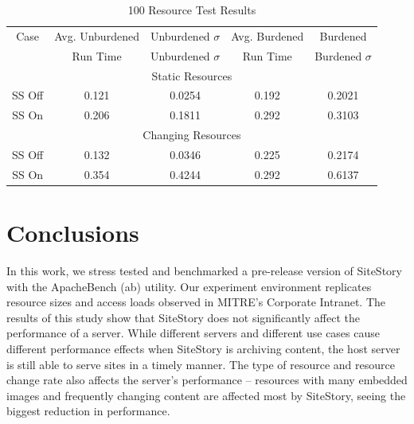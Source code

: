 \documentclass[runningheads,a4paper]{llncs}
\begin{document}
\begin{table}[t]
\caption{100 Resource Test Results} %
\centering %
\begin{tabular}{c c c c c} %
\hline\hline %
Case & Avg. Unburdened & Unburdened $\sigma$ & Avg. Burdened & Burdened\\
     & Run Time & Unburdened $\sigma$ & Run Time  & Burdened $\sigma$\\ [0.5ex] %
\hline %
\multicolumn{5}{c}{Static Resources}\\
\hline %
SS Off & 0.121 & 0.0254 & 0.192 & 0.2021 \\
SS On & 0.206 & 0.1811 & 0.292 & 0.3103 \\
\hline \hline
\multicolumn{5}{c}{Changing Resources}\\
\hline %
SS Off & 0.132 & 0.0346 & 0.225 & 0.2174 \\
SS On & 0.354 & 0.4244 & 0.292 & 0.6137 \\
\hline %
\end{tabular}
\label{table100} %
\end{table}


\section{Conclusions}
\label{conclusion}
\vskip -3mm
In this work, we stress tested and benchmarked a pre-release version of SiteStory with the ApacheBench (ab) utility. Our experiment environment replicates resource sizes and access loads observed in  MITRE's Corporate Intranet. The results of this study show that SiteStory does not significantly affect the performance of a server. While different servers and different use cases cause different performance effects when SiteStory is archiving content, the host server is still able to serve sites in a timely manner. The type of resource and resource change rate also affects the server's performance -- resources with many embedded images and frequently changing content are affected most by SiteStory, seeing the biggest reduction in performance. 
\end{document}
